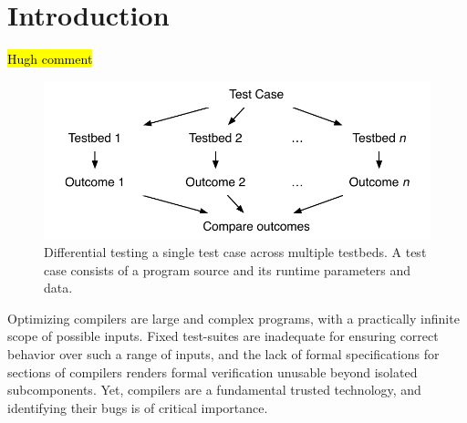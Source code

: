 \section{Introduction}\label{sec:intro}

\hl{Hugh comment}

\begin{figure}
  \centering
  \includegraphics[width=.85\columnwidth]{img/difftest} %
  \caption{%
    Differential testing a single test case across multiple testbeds. A test case consists of a program source and its runtime parameters and data. %
  }%
  \label{fig:difftest}
\end{figure}

\noindent
Optimizing compilers are large and complex programs, with a practically infinite scope of possible inputs. Fixed test-suites are inadequate for ensuring correct behavior over such a range of inputs, and the lack of formal specifications for sections of compilers renders formal verification unusable beyond isolated subcomponents. Yet, compilers are a fundamental trusted technology, and identifying their bugs is of critical importance.


